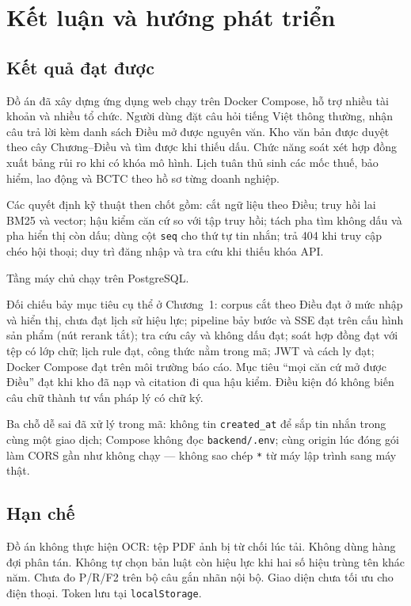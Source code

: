 \chapter{Kết luận và hướng phát triển}

\section{Kết quả đạt được}

Đồ án đã xây dựng ứng dụng web chạy trên Docker Compose, hỗ trợ nhiều tài khoản
và nhiều tổ chức. Người dùng đặt câu hỏi tiếng Việt thông thường, nhận câu trả
lời kèm danh sách Điều mở được nguyên văn. Kho \soLuat{} văn bản được duyệt theo
cây Chương--Điều và tìm được khi thiếu dấu. Chức năng soát xét hợp đồng xuất bảng
rủi ro khi có khóa mô hình. Lịch tuân thủ sinh các mốc thuế, bảo hiểm, lao động
và BCTC theo hồ sơ từng doanh nghiệp.

Các quyết định kỹ thuật then chốt gồm: cắt ngữ liệu theo Điều; truy hồi lai BM25
và vector; hậu kiểm căn cứ so với tập truy hồi; tách pha tìm không dấu và pha
hiển thị còn dấu; dùng cột \texttt{seq} cho thứ tự tin nhắn; trả 404 khi truy cập
chéo hội thoại; duy trì đăng nhập và tra cứu khi thiếu khóa API.

Tầng máy chủ chạy trên PostgreSQL.

Đối chiếu bảy mục tiêu cụ thể ở Chương~1: corpus cắt theo Điều đạt ở mức nhập
và hiển thị, chưa đạt lịch sử hiệu lực; pipeline bảy bước và SSE đạt trên cấu
hình sản phẩm (nút rerank tắt); tra cứu cây và không dấu đạt; soát hợp đồng đạt
với tệp có lớp chữ; lịch \soRule{} rule đạt, công thức nằm trong mã; JWT và
cách ly đạt; Docker Compose đạt trên môi trường báo cáo. Mục tiêu ``mọi căn cứ
mở được Điều'' đạt khi kho đã nạp và citation đi qua hậu kiểm. Điều kiện đó
không biến câu chữ thành tư vấn pháp lý có chữ ký.

Ba chỗ dễ sai đã xử lý trong mã: không tin \texttt{created\_at} để sắp tin nhắn
trong cùng một giao dịch; Compose không đọc \texttt{backend/.env}; cùng origin
lúc đóng gói làm CORS gần như không chạy --- không sao chép \texttt{*} từ máy
lập trình sang máy thật.

\section{Hạn chế}

Đồ án không thực hiện OCR: tệp PDF ảnh bị từ chối lúc tải. Không dùng hàng đợi
phân tán. Không tự chọn bản luật còn hiệu lực khi hai số hiệu trùng tên khác năm.
Chưa đo P/R/F2 trên bộ câu gắn nhãn nội bộ. Giao diện chưa tối ưu cho điện thoại.
Token lưu tại \texttt{localStorage}.

